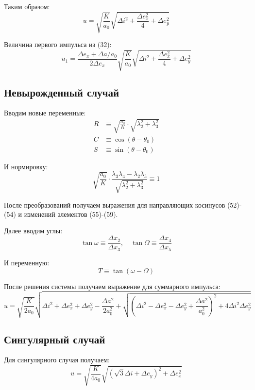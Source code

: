 \documentclass[12pt]{article}
\begin{document}
Таким образом:
\begin{equation}
u = \sqrt{\frac{K}{a_0}} \sqrt{\Delta i^2 + \frac{\Delta e_x^2}{4} + \Delta e_y^2} \tag{37}
\end{equation}

Величина первого импульса из (32):
\begin{equation}
u_1 = \frac{\Delta e_x + \Delta a/a_0}{2\Delta e_x} \sqrt{\frac{K}{a_0}} \sqrt{\Delta i^2 + \frac{\Delta e_x^2}{4} + \Delta e_y^2} \tag{38}
\end{equation}

\subsection{Невырожденный случай}

Вводим новые переменные:
\begin{align}
R &\equiv \sqrt{\frac{a_0}{K}} \cdot \sqrt{\lambda_2^2 + \lambda_3^2} \tag{50} \\
C &\equiv \cos(\theta - \theta_0) \\
S &\equiv \sin(\theta - \theta_0)
\end{align}

И нормировку:
\begin{equation}
\sqrt{\frac{a_0}{K}} \cdot \frac{\lambda_3 \lambda_4 - \lambda_2 \lambda_5}{\sqrt{\lambda_2^2 + \lambda_3^2}} \equiv 1 \tag{49}
\end{equation}

После преобразований получаем выражения для направляющих косинусов (52)-(54) и изменений элементов (55)-(59).

Далее вводим углы:
\begin{equation}
\tan \omega \equiv \frac{\Delta x_2}{\Delta x_3}, \quad \tan \Omega \equiv \frac{\Delta x_4}{\Delta x_5} \tag{60}
\end{equation}

И переменную:
\begin{equation}
T \equiv \tan(\omega - \Omega) \tag{61}
\end{equation}

После решения системы получаем выражение для суммарного импульса:
\begin{equation}
u = \sqrt{\frac{K}{2a_0}} \sqrt{\Delta i^2 + \Delta e_x^2 + \Delta e_y^2 - \frac{\Delta a^2}{2a_0^2} + \sqrt{\left(\Delta i^2 - \Delta e_x^2 - \Delta e_y^2 + \frac{\Delta a^2}{a_0^2}\right)^2 + 4\Delta i^2 \Delta e_y^2}} \tag{68}
\end{equation}

\subsection{Сингулярный случай}

Для сингулярного случая получаем:
\begin{equation}
u = \sqrt{\frac{K}{4a_0}} \sqrt{\left(\sqrt{3}\Delta i + \Delta e_y\right)^2 + \Delta e_x^2} \tag{75}
\end{equation}
\end{document}
